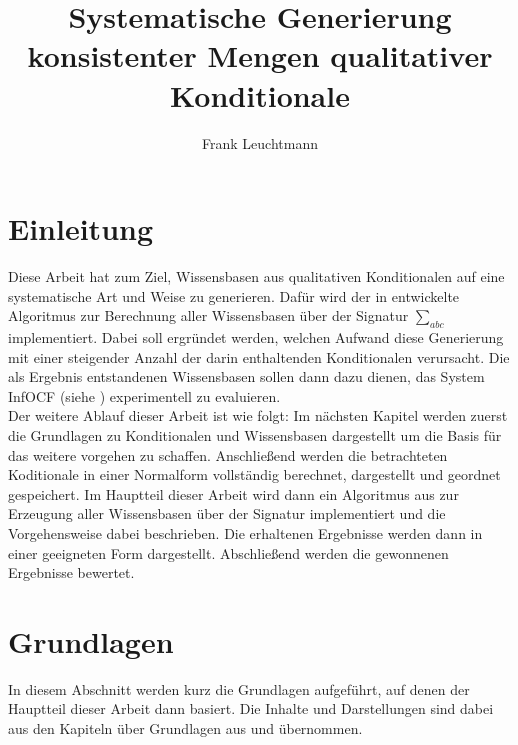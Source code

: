 \documentclass[12pt,a4paper]{article}
\author{Frank Leuchtmann}
\title{Systematische Generierung konsistenter Mengen qualitativer
Konditionale}
\begin{document}
\maketitle
\newpage
\tableofcontents
\newpage
\section{Einleitung}
Diese Arbeit hat zum Ziel, Wissensbasen aus qualitativen Konditionalen auf eine systematische Art und Weise zu generieren. Dafür wird der in \cite{beierle19} entwickelte Algoritmus zur Berechnung aller Wissensbasen über der Signatur $\sum_{abc}$ implementiert. Dabei soll ergründet werden, welchen Aufwand diese Generierung mit einer steigender Anzahl der darin  enthaltenden Konditionalen verursacht. Die als Ergebnis entstandenen Wissensbasen sollen dann dazu dienen, das System InfOCF (siehe \cite{beierle17}) experimentell zu evaluieren.
\\
Der weitere Ablauf dieser Arbeit ist wie folgt: Im nächsten Kapitel werden zuerst die Grundlagen zu Konditionalen und Wissensbasen dargestellt um die Basis für das weitere vorgehen zu schaffen. Anschließend werden die betrachteten Koditionale in einer Normalform vollständig berechnet, dargestellt und geordnet gespeichert. Im Hauptteil dieser Arbeit wird dann ein Algoritmus aus \cite{beierle19} zur Erzeugung aller Wissensbasen über der Signatur implementiert und die Vorgehensweise dabei beschrieben. Die erhaltenen Ergebnisse werden dann in einer geeigneten Form dargestellt. Abschließend werden die gewonnenen Ergebnisse bewertet.
\section{Grundlagen}
In diesem Abschnitt werden kurz die Grundlagen aufgeführt, auf denen der Hauptteil dieser Arbeit dann basiert. Die Inhalte und Darstellungen sind dabei aus den Kapiteln über Grundlagen aus \cite{beierle19} und \cite{beierle17} übernommen.
\end{document}
